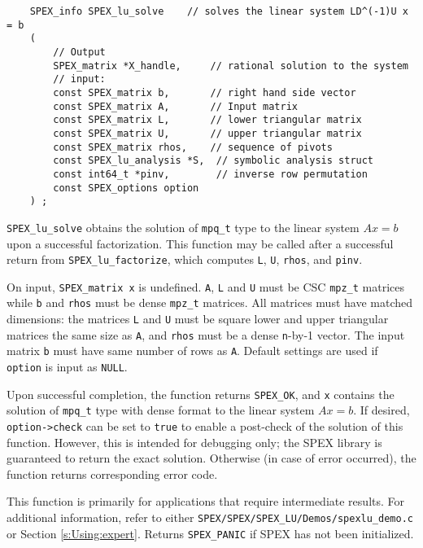 \documentclass[12pt]{report}
\theoremstyle{definition}
\begin{document}
\begin{mdframed}[userdefinedwidth=6in]
{\footnotesize
\begin{verbatim}
    SPEX_info SPEX_lu_solve    // solves the linear system LD^(-1)U x = b
    (
        // Output
        SPEX_matrix *X_handle,     // rational solution to the system
        // input:
        const SPEX_matrix b,       // right hand side vector
        const SPEX_matrix A,       // Input matrix
        const SPEX_matrix L,       // lower triangular matrix
        const SPEX_matrix U,       // upper triangular matrix
        const SPEX_matrix rhos,    // sequence of pivots
        const SPEX_lu_analysis *S,  // symbolic analysis struct
        const int64_t *pinv,        // inverse row permutation
        const SPEX_options option
    ) ;
\end{verbatim}
} \end{mdframed}

\verb|SPEX_lu_solve| obtains the solution of \verb|mpq_t| type to the
linear system $Ax=b$ upon a successful factorization.  This function may be
called after a successful return from \verb|SPEX_lu_factorize|, which
computes \verb|L|, \verb|U|, \verb|rhos|, and \verb|pinv|. 

On input, \verb|SPEX_matrix x| is undefined. \verb|A|, \verb|L| and \verb|U|
must be CSC \verb|mpz_t| matrices while \verb|b| and \verb|rhos| must be dense
\verb|mpz_t|  matrices. All matrices must have matched dimensions: the matrices
\verb|L| and \verb|U| must be square lower and upper triangular matrices the
same size as \verb|A|, and \verb|rhos| must be a dense \verb|n|-by-1 vector.
The input matrix \verb|b| must have same number of rows as \verb|A|.  Default
settings are used if \verb|option| is input as \verb|NULL|.

Upon successful completion, the function returns \verb|SPEX_OK|, and \verb|x|
contains the solution of \verb|mpq_t| type with dense format to the linear
system $Ax=b$. If desired, \verb|option->check| can be set to \verb|true| to
enable a post-check of the solution of this function.  However, this is
intended for debugging only; the SPEX library is guaranteed to return the
exact solution. Otherwise (in case of error occurred), the function returns
corresponding error code.

This function is primarily for applications that require intermediate results.
For additional information, refer to either \verb|SPEX/SPEX/SPEX_LU/Demos/spexlu_demo.c| or
Section \ref{s:Using:expert}.  Returns \verb|SPEX_PANIC| if SPEX has not
been initialized.
\end{document}

